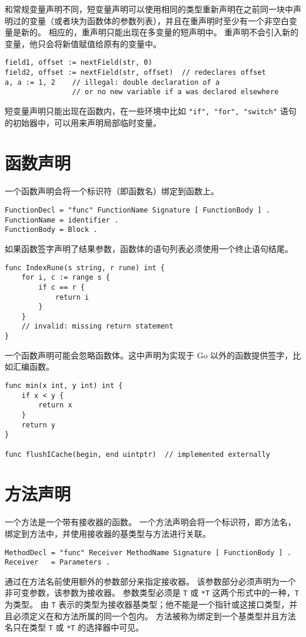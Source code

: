 和常规变量声明不同，短变量声明可以使用相同的类型重新声明在之前同一块中声明过的变量（或者块为函数体的参数列表），并且在重声明时至少有一个非空白变量是新的。
相应的，重声明只能出现在多变量的短声明中。
重声明不会引入新的变量，他只会将新值赋值给原有的变量中。
\begin{lstlisting}
field1, offset := nextField(str, 0)
field2, offset := nextField(str, offset)  // redeclares offset
a, a := 1, 2	// illegal: double declaration of a 
				// or no new variable if a was declared elsewhere
\end{lstlisting}

短变量声明只能出现在函数内，在一些环境中比如 \lstinline|"if", "for", "switch"| 语句的初始器中，可以用来声明局部临时变量。


\section{函数声明}
一个函数声明会将一个标识符（即函数名）绑定到函数上。
\begin{lstlisting}[style=EBNF]
FunctionDecl = "func" FunctionName Signature [ FunctionBody ] .
FunctionName = identifier .
FunctionBody = Block .
\end{lstlisting}
如果函数签字声明了结果参数，函数体的语句列表必须使用一个终止语句结尾。
\begin{lstlisting}[style=golang]
func IndexRune(s string, r rune) int {
	for i, c := range s {
		if c == r {
			return i
		}
	}
	// invalid: missing return statement
}
\end{lstlisting}

一个函数声明可能会忽略函数体。这中声明为实现于 Go 以外的函数提供签字，比如汇编函数。
\begin{lstlisting}[style=golang]
func min(x int, y int) int {
	if x < y {
		return x
	}
	return y
}

func flushICache(begin, end uintptr)  // implemented externally
\end{lstlisting} 

\section{方法声明} \label{sec:method declarations}
一个方法是一个带有接收器的函数。
一个方法声明会将一个标识符，即方法名，绑定到方法中，并使用接收器的基类型与方法进行关联。
\begin{lstlisting}[style=golang]
MethodDecl = "func" Receiver MethodName Signature [ FunctionBody ] .
Receiver   = Parameters .
\end{lstlisting}
通过在方法名前使用额外的参数部分来指定接收器。
该参数部分必须声明为一个非可变参数，该参数为接收器。
参数类型必须是 \lstinline|T| 或 \lstinline|*T| 这两个形式中的一种，\lstinline|T| 为类型。
由 \lstinline|T| 表示的类型为接收器基类型；他不能是一个指针或这接口类型，并且必须定义在和方法所属的同一个包内。
方法被称为绑定到一个基类型并且方法名只在类型 \lstinline|T| 或 \lstinline|*T| 的选择器中可见。

